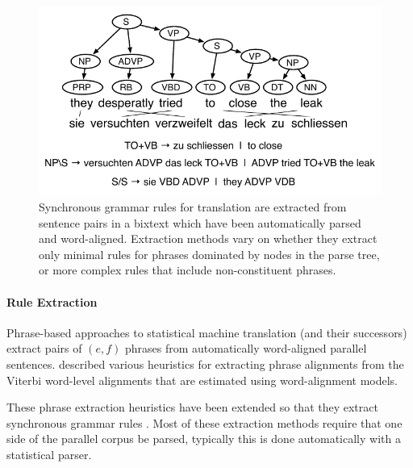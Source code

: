 \documentclass[11pt]{article}
\begin{document}
\begin{figure}[t]
\begin{center}
\includegraphics[width=0.99\linewidth]{figures/example_extraction.pdf}
\end{center}
\caption{Synchronous grammar rules for translation are extracted from sentence pairs in a bixtext which have been automatically parsed and word-aligned. Extraction methods vary on whether they extract only minimal rules for phrases dominated by nodes in the parse tree, or more complex rules that include non-constituent phrases.}
\label{example_extraction}
\end{figure}

\paragraph{Rule Extraction}

Phrase-based approaches to statistical machine translation (and their successors) extract pairs of $(e, f)$ phrases from automatically word-aligned parallel sentences. 
described various heuristics for extracting phrase alignments from the Viterbi word-level alignments that are estimated using  word-alignment models.  

These phrase extraction heuristics have been extended so that they extract synchronous grammar rules \cite{Galley2004,Chiang2005,Zollmann2006,Liu2006}.  Most of these extraction methods require that one side of the parallel corpus be parsed, typically this is done automatically with a statistical parser.  
\end{document}
